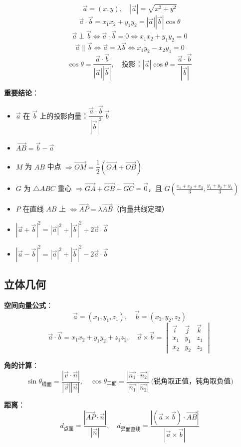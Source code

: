 \[
\vec{a} = (x,y),\quad |\vec{a}| = \sqrt{x^2+y^2}
\]
\[
\vec{a}\cdot\vec{b} = x_1x_2 + y_1y_2 = |\vec{a}||\vec{b}|\cos\theta
\]
\[
\vec{a} \perp \vec{b} \iff \vec{a}\cdot\vec{b} = 0 \iff x_1x_2 + y_1y_2 = 0
\]
\[
\vec{a} \parallel \vec{b} \iff \vec{a} = \lambda\vec{b} \iff x_1y_2 - x_2y_1 = 0
\]
\[
\cos\theta = \frac{\vec{a}\cdot\vec{b}}{|\vec{a}||\vec{b}|},\quad
\text{投影：}|\vec{a}|\cos\theta = \frac{\vec{a}\cdot\vec{b}}{|\vec{b}|}
\]

\textbf{重要结论}：
\begin{itemize}
  \item $\vec{a}$ 在 $\vec{b}$ 上的投影向量：$\dfrac{\vec{a}\cdot\vec{b}}{|\vec{b}|^2}\,\vec{b}$
  \item $\overrightarrow{AB} = \vec{b} - \vec{a}$
  \item $M$ 为 $AB$ 中点 $\Rightarrow \overrightarrow{OM} = \dfrac12(\overrightarrow{OA}+\overrightarrow{OB})$
  \item $G$ 为 $\triangle ABC$ 重心 $\Rightarrow \overrightarrow{GA}+\overrightarrow{GB}+\overrightarrow{GC}=\vec{0}$，且 $G\left(\frac{x_1+x_2+x_3}{3},\frac{y_1+y_2+y_3}{3}\right)$
  \item $P$ 在直线 $AB$ 上 $\iff \overrightarrow{AP} = \lambda\overrightarrow{AB}$（向量共线定理）
  \item $|\vec{a}+\vec{b}|^2 = |\vec{a}|^2 + |\vec{b}|^2 + 2\vec{a}\cdot\vec{b}$
  \item $|\vec{a}-\vec{b}|^2 = |\vec{a}|^2 + |\vec{b}|^2 - 2\vec{a}\cdot\vec{b}$
\end{itemize}

\subsection{立体几何}

\textbf{空间向量公式}：
\[
\vec{a} = (x_1,y_1,z_1),\quad \vec{b} = (x_2,y_2,z_2)
\]
\[
\vec{a}\cdot\vec{b} = x_1x_2 + y_1y_2 + z_1z_2,\quad
\vec{a}\times\vec{b} = \begin{vmatrix}
\vec{i} & \vec{j} & \vec{k} \\
x_1 & y_1 & z_1 \\
x_2 & y_2 & z_2
\end{vmatrix}
\]

\textbf{角的计算}：
\[
\sin\theta_{\text{线面}} = \frac{|\vec{v}\cdot\vec{n}|}{|\vec{v}||\vec{n}|},\quad
\cos\theta_{\text{二面}} = \frac{|\vec{n_1}\cdot\vec{n_2}|}{|\vec{n_1}||\vec{n_2}|}\ \text{(锐角取正值，钝角取负值)}
\]

\textbf{距离}：
\[
d_{\text{点面}} = \frac{|\overrightarrow{AP}\cdot\vec{n}|}{|\vec{n}|},\quad
d_{\text{异面直线}} = \frac{|(\vec{a}\times\vec{b})\cdot\overrightarrow{AB}|}{|\vec{a}\times\vec{b}|}
\]

